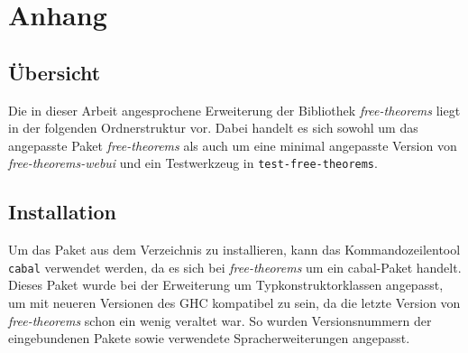 \section{Anhang}

\subsection*{Übersicht}

Die in dieser Arbeit angesprochene Erweiterung der Bibliothek \textit{free-theorems} liegt in der folgenden
Ordnerstruktur vor. Dabei handelt es sich sowohl um das angepasste Paket \textit{free-theorems} als auch um
eine minimal angepasste Version von \textit{free-theorems-webui} und ein Testwerkzeug in \texttt{test-free-theorems}.
\\



\subsection*{Installation}

Um das Paket aus dem Verzeichnis zu installieren, kann das Kommandozeilentool \texttt{cabal} verwendet werden,
da es sich bei \textit{free-theorems} um ein cabal-Paket handelt. Dieses Paket wurde bei der Erweiterung um
Typkonstruktorklassen angepasst, um mit neueren Versionen des GHC kompatibel zu sein, da die letzte Version
von \textit{free-theorems} schon ein wenig veraltet war. So wurden Versionsnummern der eingebundenen Pakete
sowie verwendete Spracherweiterungen angepasst.

